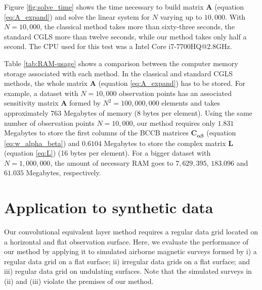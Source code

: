 \documentclass[manuscript]{geophysics}
\begin{document}
Figure \ref{fig:solve_time} shows the time necessary to build matrix $\mathbf{A}$ 
(equation \ref{eq:A_expand}) and solve the linear system for $N$ varying up to $10,000$. 
With $N = 10,000$, the classical method takes more than sixty-three seconds, the standard 
CGLS more than twelve seconds, while our method takes only half a second. 
The CPU used for this test was a Intel Core i7-7700HQ@2.8GHz.


Table \ref{tab:RAM-usage} shows a comparison between the computer memory storage 
associated with each method. In the classical and standard CGLS methods, the whole 
matrix $\mathbf{A}$ (equation \ref{eq:A_expand}) has to be stored. For example, a dataset with 
$N = 10,000$ observation points has an associated sensitivity matrix $\mathbf{A}$ formed by 
$N^2 = 100,000,000$ elements and takes approximately $763$ Megabytes of memory (8 bytes per element). 
Using the same number of observation points $N = 10,000$, our method requires only 
$1.831$ Megabytes to store the first columns of the BCCB matrices
$\mathbf{C}_{\boldsymbol{\alpha\beta}}$ (equation \ref{eq:w_alpha_beta}) and 
$0.6104$ Megabytes to store the complex matrix $\mathbf{L}$ (equation \ref{eq:L}) 
(16 bytes per element). For a bigger dataset with $N = 1,000,000$, the amount of necessary RAM 
goes to $7,629,395$, $183.096$ and $61.035$ Megabytes, respectively.

\section{Application to synthetic data}

Our convolutional equivalent layer method requires a regular data grid located on a 
horizontal and flat observation surface.
Here, we evaluate the performance of our method by applying it to simulated airborne magnetic 
surveys formed by
i) a regular data grid on a flat surface;
ii) irregular data grids on a flat surface; and 
iii) regular data grid on undulating surfaces.
Note that the simulated surveys in (ii) and (iii) violate the premises of our method. 
\end{document}
